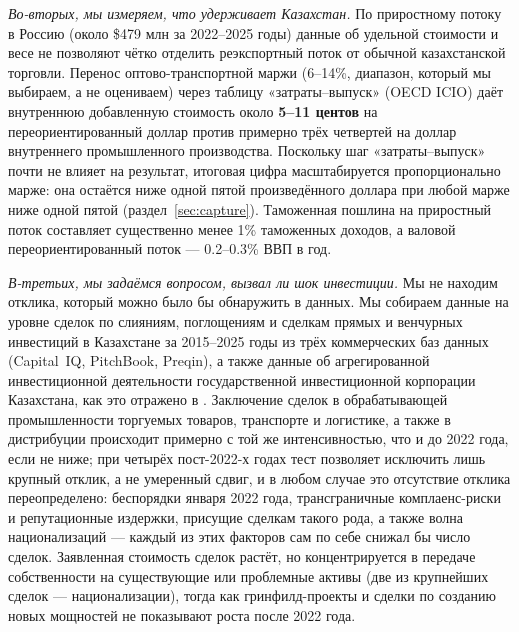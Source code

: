 \documentclass[12pt]{article}
\begin{document}
\emph{Во-вторых, мы измеряем, что удерживает Казахстан.} По приростному потоку в Россию
(около \$479 млн за 2022--2025 годы) данные об удельной стоимости и весе не позволяют чётко
отделить реэкспортный поток от обычной казахстанской торговли. Перенос
оптово-транспортной маржи (6--14\%, диапазон, который мы выбираем, а не оцениваем) через
таблицу «затраты--выпуск» (OECD ICIO) даёт внутреннюю добавленную стоимость около
\textbf{5--11 центов} на переориентированный доллар против примерно трёх четвертей на
доллар внутреннего промышленного производства. Поскольку шаг «затраты--выпуск» почти не
влияет на результат, итоговая цифра масштабируется пропорционально марже: она остаётся
ниже одной пятой произведённого доллара при любой марже ниже одной пятой
(раздел~\ref{sec:capture}). Таможенная пошлина на приростный поток составляет существенно
менее 1\% таможенных доходов, а валовой переориентированный поток — 0.2--0.3\% ВВП в год.

\emph{В-третьих, мы задаёмся вопросом, вызвал ли шок инвестиции.} Мы не находим отклика,
который можно было бы обнаружить в данных. Мы собираем данные на уровне сделок по слияниям,
поглощениям и сделкам прямых и венчурных инвестиций в Казахстане за 2015--2025 годы из трёх
коммерческих баз данных (Capital~IQ, PitchBook, Preqin), а также данные об агрегированной
инвестиционной деятельности государственной инвестиционной корпорации Казахстана, как это
отражено в \citet{qicaifcifc2026pe}. Заключение сделок в обрабатывающей промышленности
торгуемых товаров, транспорте и логистике, а также в дистрибуции происходит примерно с той
же интенсивностью, что и до 2022 года, если не ниже; при четырёх пост-2022-х годах тест
позволяет исключить лишь крупный отклик, а не умеренный сдвиг, и в любом случае это
отсутствие отклика переопределено: беспорядки января 2022 года, трансграничные
комплаенс-риски и репутационные издержки, присущие сделкам такого рода, а также волна
национализаций — каждый из этих факторов сам по себе снижал бы число сделок. Заявленная
стоимость сделок растёт, но концентрируется в передаче собственности на существующие или
проблемные активы (две из крупнейших сделок — национализации), тогда как гринфилд-проекты
и сделки по созданию новых мощностей не показывают роста после 2022 года.
\end{document}
